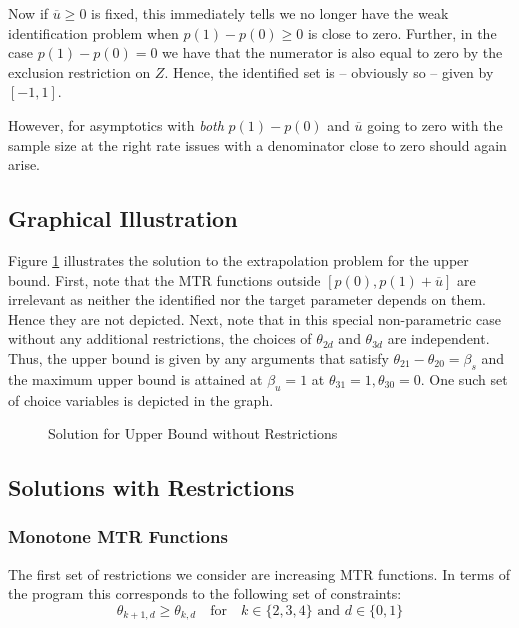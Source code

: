 \documentclass[11pt,a4paper,english]{article} %
\numberwithin{equation}{section}
\numberwithin{figure}{section}
\numberwithin{table}{section}
\theoremstyle{definition}
\theoremstyle{remark}
\begin{document}
Now if $\overline{u}\geq0$ is fixed, this immediately tells we no longer have the weak identification problem when $p(1) - p(0)\geq0$ is close to zero. Further, in the case $p(1) - p(0) = 0$ we have that the numerator is also equal to zero by the exclusion restriction on $Z$. Hence, the identified set is -- obviously so -- given by $[-1, 1]$.

However, for asymptotics with \textit{both} $p(1) - p(0)$ and $\overline{u}$ going to zero with the sample size at the right rate issues with a denominator close to zero should again arise.

\subsection{Graphical Illustration}
Figure \ref{fig:sm_upper_no_restr} illustrates the solution to the extrapolation problem for the upper bound.
First, note that the MTR functions outside $[p(0), p(1) + \overline{u}]$ are irrelevant as neither the identified nor the target parameter depends on them. Hence they are not depicted.
Next, note that in this special non-parametric case without any additional restrictions, the choices of $\theta_{2d}$ and $\theta_{3d}$ are independent.
Thus, the upper bound is given by any arguments that satisfy $\theta_{21} - \theta_{20} = \beta_s$ and the maximum upper bound is attained at $\beta_u = 1$ at $\theta_{31} = 1, \theta_{30} = 0$.
One such set of choice variables is depicted in the graph.

\begin{figure}
	
	\caption{Solution for Upper Bound without Restrictions}
	\label{fig:sm_upper_no_restr}
\end{figure}

\subsection{Solutions with Restrictions}
\subsubsection{Monotone MTR Functions}
The first set of restrictions we consider are increasing MTR functions.
In terms of the program this corresponds to the following set of constraints:
\begin{equation}
	\theta_{k+1,d} \geq \theta_{k,d} \quad \text{for} \quad k \in \{2, 3, 4\} \text{ and } d \in \{0,1\}
\end{equation}
\end{document}
